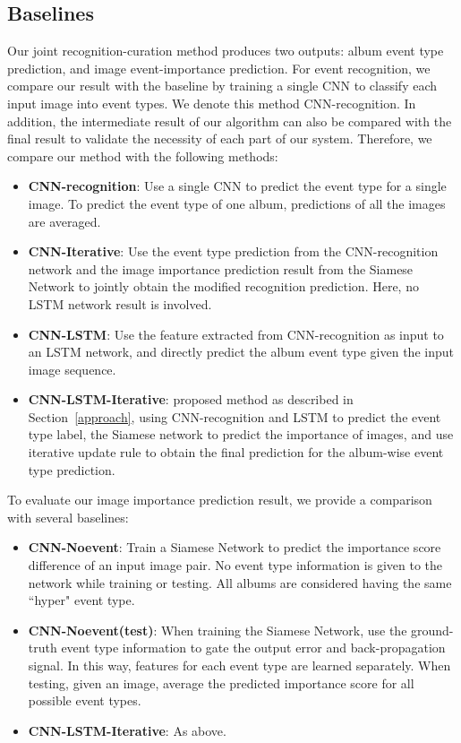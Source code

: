 \documentclass[runningheads]{llncs}
\begin{document}
\subsection{Baselines}
Our joint recognition-curation method produces two outputs: album event type prediction, and image event-importance prediction. 
For event recognition, we compare our result with the baseline by training a single CNN to classify each input image into event types. We denote this method CNN-recognition. In addition, the intermediate result of our algorithm can also be compared with the final result to validate the necessity of each part of our system. Therefore, we compare our method with the following methods:
\begin{itemize}
  \item \textbf{CNN-recognition}: Use a single CNN to predict the event type for a single image. To predict the event type of one album, predictions of all the images are averaged.
  \item \textbf{CNN-Iterative}: Use the event type prediction from the CNN-recognition network and the image importance prediction result from the Siamese Network to jointly obtain the modified recognition prediction. Here, no LSTM network result is involved. 
    \item \textbf{CNN-LSTM}: Use the feature extracted from CNN-recognition as input to an LSTM network, and directly predict the album event type given the input image sequence.
  \item \textbf{CNN-LSTM-Iterative}: proposed method as described in Section~\ref{approach}, using CNN-recognition and LSTM to predict the event type label, the Siamese network to predict the importance of images, and use iterative update rule to obtain the final prediction for the album-wise event type prediction. 
\end{itemize}

To evaluate our image importance prediction result, we provide a comparison with several baselines:
\begin{itemize}
  \item \textbf{CNN-Noevent}: Train a Siamese Network to predict the importance score difference of an input image pair. No event type information is given to the network while training or testing. All albums are considered having the same ``hyper" event type.
  \item \textbf{CNN-Noevent(test)}: When training the Siamese Network, use the ground-truth event type information to gate the output error and back-propagation signal. In this way, features for each event type are learned separately. When testing, given an image, average the predicted importance score for all possible event types.  
    \item \textbf{CNN-LSTM-Iterative}: As above.
    \end{itemize}
\end{document}
